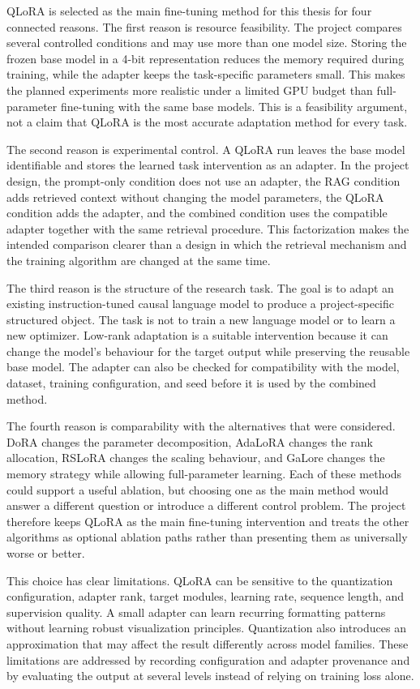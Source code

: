 QLoRA is selected as the main fine-tuning method for this thesis for four connected reasons. The first reason is resource feasibility. The project compares several controlled conditions and may use more than one model size. Storing the frozen base model in a 4-bit representation reduces the memory required during training, while the adapter keeps the task-specific parameters small. This makes the planned experiments more realistic under a limited GPU budget than full-parameter fine-tuning with the same base models. This is a feasibility argument, not a claim that QLoRA is the most accurate adaptation method for every task.

The second reason is experimental control. A QLoRA run leaves the base model identifiable and stores the learned task intervention as an adapter. In the project design, the prompt-only condition does not use an adapter, the RAG condition adds retrieved context without changing the model parameters, the QLoRA condition adds the adapter, and the combined condition uses the compatible adapter together with the same retrieval procedure. This factorization makes the intended comparison clearer than a design in which the retrieval mechanism and the training algorithm are changed at the same time.

The third reason is the structure of the research task. The goal is to adapt an existing instruction-tuned causal language model to produce a project-specific structured object. The task is not to train a new language model or to learn a new optimizer. Low-rank adaptation is a suitable intervention because it can change the model's behaviour for the target output while preserving the reusable base model. The adapter can also be checked for compatibility with the model, dataset, training configuration, and seed before it is used by the combined method.

The fourth reason is comparability with the alternatives that were considered. DoRA changes the parameter decomposition, AdaLoRA changes the rank allocation, RSLoRA changes the scaling behaviour, and GaLore changes the memory strategy while allowing full-parameter learning. Each of these methods could support a useful ablation, but choosing one as the main method would answer a different question or introduce a different control problem. The project therefore keeps QLoRA as the main fine-tuning intervention and treats the other algorithms as optional ablation paths rather than presenting them as universally worse or better.

This choice has clear limitations. QLoRA can be sensitive to the quantization configuration, adapter rank, target modules, learning rate, sequence length, and supervision quality. A small adapter can learn recurring formatting patterns without learning robust visualization principles. Quantization also introduces an approximation that may affect the result differently across model families. These limitations are addressed by recording configuration and adapter provenance and by evaluating the output at several levels instead of relying on training loss alone.

